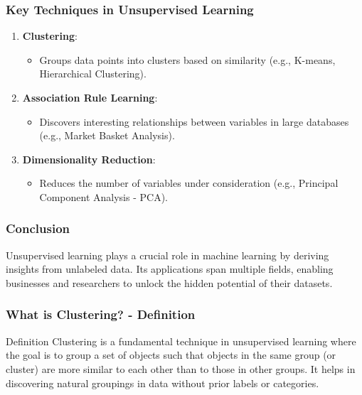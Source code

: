 \documentclass[aspectratio=169]{beamer}
\begin{document}
\begin{frame}[fragile]
    \frametitle{Key Techniques in Unsupervised Learning}
    \begin{enumerate}
        \item \textbf{Clustering}:
        \begin{itemize}
            \item Groups data points into clusters based on similarity (e.g., K-means, Hierarchical Clustering).
        \end{itemize}
        
        \item \textbf{Association Rule Learning}:
        \begin{itemize}
            \item Discovers interesting relationships between variables in large databases (e.g., Market Basket Analysis).
        \end{itemize}
        
        \item \textbf{Dimensionality Reduction}:
        \begin{itemize}
            \item Reduces the number of variables under consideration (e.g., Principal Component Analysis - PCA).
        \end{itemize}
    \end{enumerate}
\end{frame}

\begin{frame}[fragile]
    \frametitle{Conclusion}
    Unsupervised learning plays a crucial role in machine learning by deriving insights from unlabeled data. Its applications span multiple fields, enabling businesses and researchers to unlock the hidden potential of their datasets.
\end{frame}

\begin{frame}[fragile]
    \frametitle{What is Clustering? - Definition}
    \begin{block}{Definition}
        Clustering is a fundamental technique in unsupervised learning where the goal is to group a set of objects such that objects in the same group (or cluster) are more similar to each other than to those in other groups. 
        It helps in discovering natural groupings in data without prior labels or categories.
    \end{block}
\end{frame}
\end{document}
